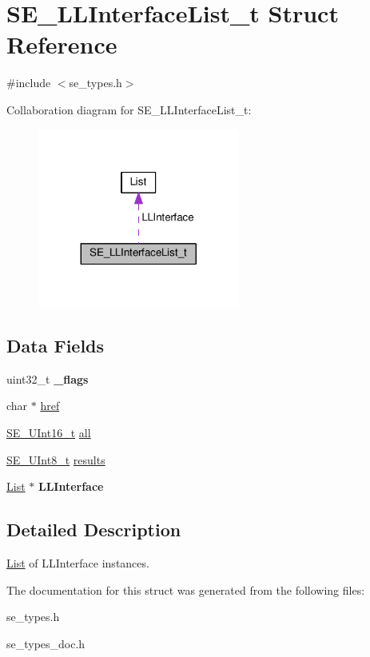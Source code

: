 \hypertarget{structSE__LLInterfaceList__t}{}\section{S\+E\+\_\+\+L\+L\+Interface\+List\+\_\+t Struct Reference}
\label{structSE__LLInterfaceList__t}


{\ttfamily \#include $<$se\+\_\+types.\+h$>$}



Collaboration diagram for S\+E\+\_\+\+L\+L\+Interface\+List\+\_\+t\+:\nopagebreak
\begin{figure}[H]
\begin{center}
\leavevmode
\includegraphics[width=188pt]{structSE__LLInterfaceList__t__coll__graph}
\end{center}
\end{figure}
\subsection*{Data Fields}
\begin{DoxyCompactItemize}
\item 
uint32\+\_\+t {\bfseries \+\_\+flags}
\item 
char $\ast$ \hyperlink{group__LLInterfaceList_gaffb34fa53a2595c094d76738fe29e7be}{href}
\item 
\hyperlink{group__UInt16_gac68d541f189538bfd30cfaa712d20d29}{S\+E\+\_\+\+U\+Int16\+\_\+t} \hyperlink{group__LLInterfaceList_ga3ce3494c72fc68465b2be53fb184ba19}{all}
\item 
\hyperlink{group__UInt8_gaf7c365a1acfe204e3a67c16ed44572f5}{S\+E\+\_\+\+U\+Int8\+\_\+t} \hyperlink{group__LLInterfaceList_ga1e311149c0035e37d619f777697b2602}{results}
\item 
\hyperlink{structList}{List} $\ast$ {\bfseries L\+L\+Interface}
\end{DoxyCompactItemize}


\subsection{Detailed Description}
\hyperlink{structList}{List} of L\+L\+Interface instances. 

The documentation for this struct was generated from the following files\+:\begin{DoxyCompactItemize}
\item 
se\+\_\+types.\+h\item 
se\+\_\+types\+\_\+doc.\+h\end{DoxyCompactItemize}

